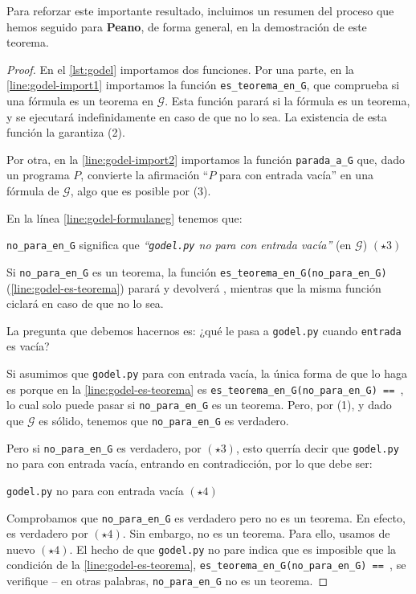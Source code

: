 Para reforzar este importante resultado, incluimos un resumen del proceso que hemos seguido para \textbf{Peano}, de forma general, en la demostración de este teorema.

\begin{proof}
En el \cref{lst:godel} importamos dos funciones. Por una parte, en la \cref{line:godel-import1} importamos la función \texttt{es\_teorema\_en\_G}, que comprueba si una fórmula es un teorema en $\mathcal{G}$. Esta función parará si la fórmula es un teorema, y se ejecutará indefinidamente en caso de que no lo sea. La existencia de esta función la garantiza (2).

Por otra, en la \cref{line:godel-import2} importamos la función \texttt{parada\_a\_G} que, dado un programa $P$, convierte la afirmación ``$P$ para con entrada vacía'' en una fórmula de $\mathcal{G}$, algo que es posible por (3).

En la línea \cref{line:godel-formulaneg} tenemos que:
\begin{adjustwidth}{30pt}{}
    \texttt{no\_para\_en\_G} significa que \emph{``\texttt{godel.py} no para con entrada vacía''} (en $\mathcal{G}$)  \hfill $(\star3)$
\end{adjustwidth}
Si \texttt{no\_para\_en\_G} es un teorema, la función \texttt{es\_teorema\_en\_G(no\_para\_en\_G)} (\cref{line:godel-es-teorema}) parará y devolverá , mientras que la misma función ciclará en caso de que no lo sea.

La pregunta que debemos hacernos es: ¿qué le pasa a \texttt{godel.py} cuando \texttt{entrada} es vacía?

Si asumimos que \texttt{godel.py} para con entrada vacía, la única forma de que lo haga es porque en la \cref{line:godel-es-teorema} es \texttt{es\_teorema\_en\_G(no\_para\_en\_G) == }, lo cual solo puede pasar si \texttt{no\_para\_en\_G} es un teorema. Pero, por (1), y dado que $\mathcal{G}$ es sólido, tenemos que \texttt{no\_para\_en\_G} es verdadero.

Pero si \texttt{no\_para\_en\_G} es verdadero, por $(\star3)$, esto querría decir que \texttt{godel.py} no para con entrada vacía, entrando en contradicción, por lo que debe ser:
\begin{adjustwidth}{30pt}{}
    \texttt{godel.py} no para con entrada vacía  \hfill $(\star4)$
\end{adjustwidth}
Comprobamos que \texttt{no\_para\_en\_G} es verdadero pero no es un teorema. En efecto, es verdadero por $(\star4)$. Sin embargo, no es un teorema. Para ello, usamos de nuevo $(\star4)$. El hecho de que \texttt{godel.py} no pare indica que es imposible que la condición de la \cref{line:godel-es-teorema}, \linebreak\texttt{es\_teorema\_en\_G(no\_para\_en\_G) == }, se verifique -- en otras palabras, \texttt{no\_para\_en\_G} no es un teorema.
\end{proof}

